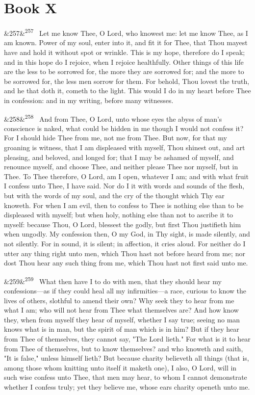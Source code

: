 \documentclass[12pt]{article}
\newcommand{\para}[1][]{\par\noindent\ifx&#1&\else\textsuperscript{\footnotesize #1}~\fi}
\begin{document}
\section*{Book X}

\para[257] Let me know Thee, O Lord, who knowest me: let me know Thee, as I am known. Power of my soul, enter into it, and fit it for Thee, that Thou mayest have and hold it without spot or wrinkle. This is my hope, therefore do I speak; and in this hope do I rejoice, when I rejoice healthfully. Other things of this life are the less to be sorrowed for, the more they are sorrowed for; and the more to be sorrowed for, the less men sorrow for them. For behold, Thou lovest the truth, and he that doth it, cometh to the light. This would I do in my heart before Thee in confession: and in my writing, before many witnesses.

\para[258] And from Thee, O Lord, unto whose eyes the abyss of man's conscience is naked, what could be hidden in me though I would not confess it? For I should hide Thee from me, not me from Thee. But now, for that my groaning is witness, that I am displeased with myself, Thou shinest out, and art pleasing, and beloved, and longed for; that I may be ashamed of myself, and renounce myself, and choose Thee, and neither please Thee nor myself, but in Thee. To Thee therefore, O Lord, am I open, whatever I am; and with what fruit I confess unto Thee, I have said. Nor do I it with words and sounds of the flesh, but with the words of my soul, and the cry of the thought which Thy ear knoweth. For when I am evil, then to confess to Thee is nothing else than to be displeased with myself; but when holy, nothing else than not to ascribe it to myself: because Thou, O Lord, blessest the godly, but first Thou justifieth him when ungodly. My confession then, O my God, in Thy sight, is made silently, and not silently. For in sound, it is silent; in affection, it cries aloud. For neither do I utter any thing right unto men, which Thou hast not before heard from me; nor dost Thou hear any such thing from me, which Thou hast not first said unto me.

\para[259] What then have I to do with men, that they should hear my confessions---as if they could heal all my infirmities---a race, curious to know the lives of others, slothful to amend their own? Why seek they to hear from me what I am; who will not hear from Thee what themselves are? And how know they, when from myself they hear of myself, whether I say true; seeing no man knows what is in man, but the spirit of man which is in him? But if they hear from Thee of themselves, they cannot say, "The Lord lieth." For what is it to hear from Thee of themselves, but to know themselves? and who knoweth and saith, "It is false," unless himself lieth? But because charity believeth all things (that is, among those whom knitting unto itself it maketh one), I also, O Lord, will in such wise confess unto Thee, that men may hear, to whom I cannot demonstrate whether I confess truly; yet they believe me, whose ears charity openeth unto me.
\end{document}
